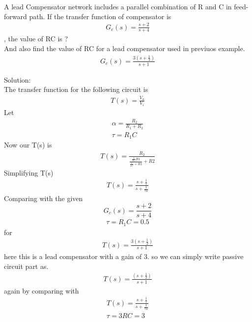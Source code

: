 \begin{enumerate}[label=\thesection.\arabic*.,ref=\thesection.\theenumi]

\begin{frame}
   A lead Compensator network includes a parallel combination of R and C in feed-forward path. If the transfer function of compensator  is \begin{align}G_c(s) = \frac{s+2}{s+4}\end{align}, the value of RC is ?\\
   And also find the value of RC for a lead compensator used in previuos example. \begin{align}G_c(s) = \frac{3(s+\frac{1}{3})}{s+1}\end{align}
\begin{figure}[!ht]
    \begin{center}
    \resizebox{\columnwidth}{!}{}
    \end{center}
\caption{}
\label{fig:ee18btech11005}
\end{figure}

Solution:\\
The transfer function for the following circuit is
    \begin{align}
    T(s) = \frac{V_o}{V_i}
    \end{align}
    Let
    \begin{align}
    \alpha = \frac{R_2}{R_1 + R_2}\\
    \tau = R_1C
    \end{align}
Now our T(s) is 
    \begin{align}
    T(s) = \frac{R_2}{\frac{\frac{1}{sC}R1}{\frac{1}{sC}+R1} + R2}
    \end{align}
    Simplifying T(s)
    \begin{align}
    T(s) = \frac{s+\frac{1}{\tau}}{s+\frac{1}{\tau\alpha}}
    \end{align}
    Comparing with the given $$G_c(s) = \frac{s+2}{s+4}$$
    \begin{align}
    \tau = R_1C = 0.5
    \end{align}
    for
    \begin{align}
    T(s) = \frac{3(s+\frac{1}{3})}{s+1}
    \end{align}
    here this is a lead compensator with a gain of 3.
    so we can simply write passive circuit part as.
     \begin{align}
    T(s) = \frac{(s+\frac{1}{3})}{s+1}
    \end{align}
    again by comparing with 
    \begin{align}
    T(s) = \frac{s+\frac{1}{\tau}}{s+\frac{1}{\tau\alpha}}\\
    \tau = 3
    RC = 3
    \end{align}
\end{frame}

\end{enumerate}
